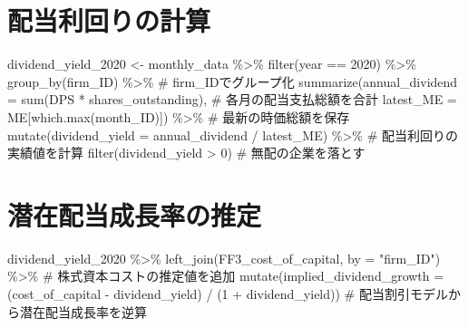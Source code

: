 \documentclass[
  letterpaper,
  DIV=11,
  numbers=noendperiod]{scrreprt}
\newenvironment{Shaded}{\begin{snugshade}}{\end{snugshade}}
\newcommand{\AttributeTok}[1]{\textcolor[rgb]{0.40,0.45,0.13}{#1}}
\newcommand{\CommentTok}[1]{\textcolor[rgb]{0.37,0.37,0.37}{#1}}
\newcommand{\DecValTok}[1]{\textcolor[rgb]{0.68,0.00,0.00}{#1}}
\newcommand{\FunctionTok}[1]{\textcolor[rgb]{0.28,0.35,0.67}{#1}}
\newcommand{\NormalTok}[1]{\textcolor[rgb]{0.00,0.23,0.31}{#1}}
\newcommand{\OtherTok}[1]{\textcolor[rgb]{0.00,0.23,0.31}{#1}}
\newcommand{\SpecialCharTok}[1]{\textcolor[rgb]{0.37,0.37,0.37}{#1}}
\newcommand{\StringTok}[1]{\textcolor[rgb]{0.13,0.47,0.30}{#1}}
\begin{document}
\section{配当利回りの計算}\label{ux914dux5f53ux5229ux56deux308aux306eux8a08ux7b97}

\begin{Shaded}
\begin{Highlighting}[]
\NormalTok{dividend\_yield\_2020 }\OtherTok{\textless{}{-}}\NormalTok{ monthly\_data }\SpecialCharTok{\%\textgreater{}\%} 
  \FunctionTok{filter}\NormalTok{(year }\SpecialCharTok{==} \DecValTok{2020}\NormalTok{) }\SpecialCharTok{\%\textgreater{}\%}
  \FunctionTok{group\_by}\NormalTok{(firm\_ID) }\SpecialCharTok{\%\textgreater{}\%} \CommentTok{\# firm\_IDでグループ化}
  \FunctionTok{summarize}\NormalTok{(}\AttributeTok{annual\_dividend =} \FunctionTok{sum}\NormalTok{(DPS }\SpecialCharTok{*}\NormalTok{ shares\_outstanding), }\CommentTok{\# 各月の配当支払総額を合計}
            \AttributeTok{latest\_ME =}\NormalTok{ ME[}\FunctionTok{which.max}\NormalTok{(month\_ID)]) }\SpecialCharTok{\%\textgreater{}\%}  \CommentTok{\# 最新の時価総額を保存}
  \FunctionTok{mutate}\NormalTok{(}\AttributeTok{dividend\_yield =}\NormalTok{ annual\_dividend }\SpecialCharTok{/}\NormalTok{ latest\_ME) }\SpecialCharTok{\%\textgreater{}\%} \CommentTok{\# 配当利回りの実績値を計算}
  \FunctionTok{filter}\NormalTok{(dividend\_yield }\SpecialCharTok{\textgreater{}} \DecValTok{0}\NormalTok{) }\CommentTok{\# 無配の企業を落とす}
\end{Highlighting}
\end{Shaded}

\section{潜在配当成長率の推定}\label{ux6f5cux5728ux914dux5f53ux6210ux9577ux7387ux306eux63a8ux5b9a}

\begin{Shaded}
\begin{Highlighting}[]
\NormalTok{dividend\_yield\_2020 }\SpecialCharTok{\%\textgreater{}\%} 
  \FunctionTok{left\_join}\NormalTok{(FF3\_cost\_of\_capital, }\AttributeTok{by =} \StringTok{"firm\_ID"}\NormalTok{) }\SpecialCharTok{\%\textgreater{}\%} \CommentTok{\# 株式資本コストの推定値を追加}
  \FunctionTok{mutate}\NormalTok{(}\AttributeTok{implied\_dividend\_growth =}\NormalTok{ (cost\_of\_capital }\SpecialCharTok{{-}}\NormalTok{ dividend\_yield) }\SpecialCharTok{/}\NormalTok{ (}\DecValTok{1} \SpecialCharTok{+}\NormalTok{ dividend\_yield)) }\CommentTok{\# 配当割引モデルから潜在配当成長率を逆算}
\end{Highlighting}
\end{Shaded}
\end{document}
